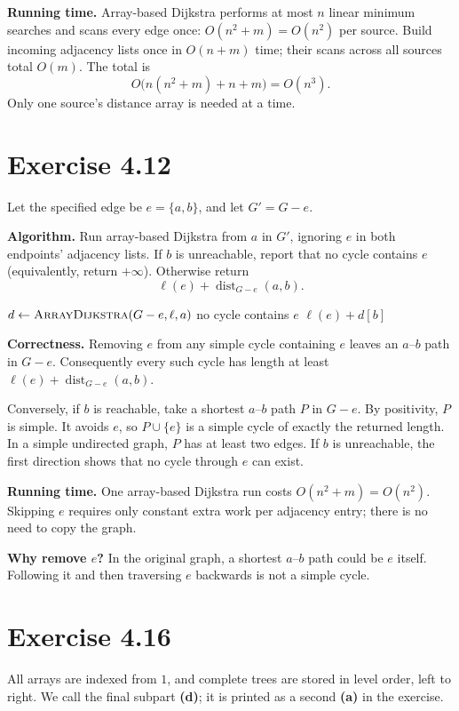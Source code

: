 \documentclass[11pt]{article}
\newcommand{\dist}{\operatorname{dist}}
\newcommand{\exercise}[1]{\Needspace{6\baselineskip}\section*{Exercise #1}}
\begin{document}
\textbf{Running time.} Array-based Dijkstra performs at most $n$ linear
minimum searches and scans every edge once: $O(n^2+m)=O(n^2)$ per source.
Build incoming adjacency lists once in $O(n+m)$ time; their scans across
all sources total $O(m)$. The total is
\[
  O\bigl(n(n^2+m)+n+m\bigr)=\boxed{O(n^3)}.
\]
Only one source's distance array is needed at a time.

\exercise{4.12}

Let the specified edge be $e=\{a,b\}$, and let $G'=G-e$.

\textbf{Algorithm.} Run array-based Dijkstra from $a$ in $G'$, ignoring
$e$ in both endpoints' adjacency lists. If $b$ is unreachable, report
that no cycle contains $e$ (equivalently, return $+\infty$). Otherwise return
\[
  \boxed{\ell(e)+\dist_{G-e}(a,b).}
\]

\begin{algorithm}[H]
\caption{Shortest cycle through a specified undirected edge}
\begin{algorithmic}[1]
  \State $d\gets\Call{ArrayDijkstra}{G-e,\ell,a}$
    \State \Return \textnormal{no cycle contains $e$}
  \EndIf
  \State \Return $\ell(e)+d[b]$
\EndFunction
\end{algorithmic}
\end{algorithm}

\textbf{Correctness.} Removing $e$ from any simple cycle containing $e$
leaves an $a$--$b$ path in $G-e$. Consequently every such cycle has length
at least $\ell(e)+\dist_{G-e}(a,b)$.

Conversely, if $b$ is reachable, take a shortest $a$--$b$ path $P$ in
$G-e$. By positivity, $P$ is simple. It avoids $e$, so $P\cup\{e\}$ is a
simple cycle of exactly the returned length. In a simple undirected
graph, $P$ has at least two edges. If $b$ is unreachable, the first
direction shows that no cycle through $e$ can exist.

\textbf{Running time.} One array-based Dijkstra run costs
$O(n^2+m)=\boxed{O(n^2)}$.
Skipping $e$ requires only constant extra work per adjacency entry;
there is no need to copy the graph.

\textbf{Why remove $e$?} In the original graph, a shortest $a$--$b$ path
could be $e$ itself. Following it and then traversing $e$ backwards is
not a simple cycle.

\exercise{4.16}

All arrays are indexed from $1$, and complete trees are stored in
level order, left to right. We call the final subpart \textbf{(d)};
it is printed as a second \textbf{(a)} in the exercise.
\end{document}

